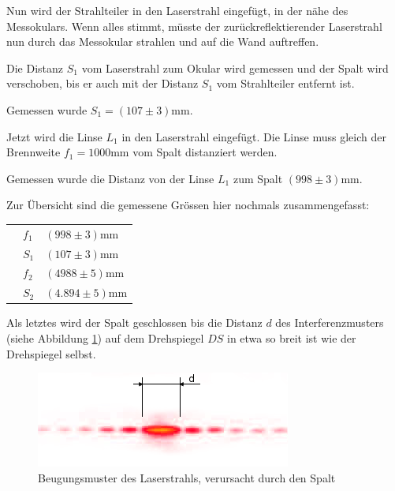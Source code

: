 Nun  wird  der  Strahlteiler  in  den Laserstrahl eingef\"ugt, in der n\"ahe des
Messokulars. Wenn alles stimmt, m\"usste der zur\"uckreflektierender Laserstrahl
nun   durch   das   Messokular   strahlen   und   auf   die   Wand   auftreffen.

Die  Distanz  $S_1$  vom Laserstrahl zum Okular wird gemessen und der Spalt wird
verschoben,  bis  er  auch  mit der Distanz $S_1$ vom Strahlteiler entfernt ist.

Gemessen wurde $S_1 = (107\pm3)\textrm{mm}$.

Jetzt wird die Linse $L_1$ in den Laserstrahl eingef\"ugt. Die Linse muss gleich
der   Brennweite   $f_1   =   1000\textrm{mm}$  vom  Spalt  distanziert  werden.

Gemessen wurde die Distanz von der Linse $L_1$ zum Spalt $(998\pm3)\textrm{mm}$.

Zur \"Ubersicht sind die gemessene Gr\"ossen hier nochmals zusammengefasst:

\begin{tabular}{lp{25mm}l}
    \hspace{4mm}
    & $f_1$ & $(998\pm3)\textrm{mm}$ \\
    & $S_1$ & $(107\pm3)\textrm{mm}$ \\
    & $f_2$ & $(4988\pm5)\textrm{mm}$ \\
    & $S_2$ & $(4.894\pm5)\textrm{mm}$ \\
\end{tabular}

Als   letztes   wird   der   Spalt   geschlossen   bis   die   Distanz  $d$  des
Interferenzmusters  (siehe  Abbildung \ref{fig:diffraction}) auf dem Drehspiegel
$DS$    in    etwa    so    breit    ist    wie    der    Drehspiegel    selbst.

\begin{figure}[H]
    \center
    \includegraphics[width=.9\textwidth]{images/diffraction.png}
    \caption{Beugungsmuster des Laserstrahls, verursacht durch den Spalt}
    \label{fig:diffraction}
\end{figure}

